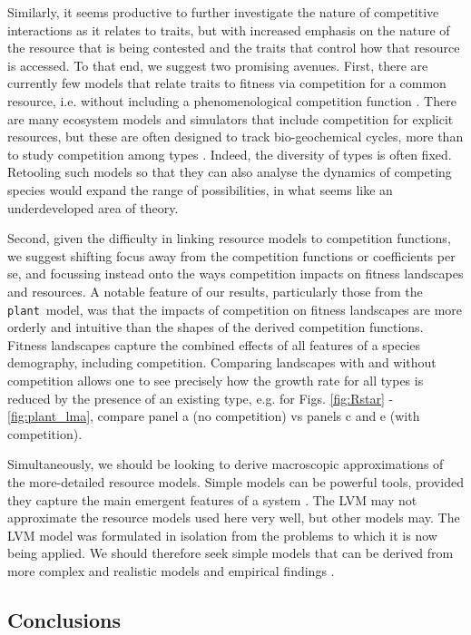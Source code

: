 \documentclass[a4paper,11pt]{article}
\newcommand{\plant}{{\tt plant}}
\begin{document}
Similarly, it seems productive to further investigate the nature of competitive interactions as it relates to traits, but with increased emphasis on the nature of the resource that is being contested and the traits that control how that resource is accessed. To that end, we suggest two promising avenues. First, there are currently few models that relate traits to fitness via competition for a common resource, i.e. without including a phenomenological competition function \citep{DAndrea-2016a}. There are many ecosystem models and simulators that include competition for explicit resources, but these are often designed to track bio-geochemical cycles, more than to study competition among types \citep{Fisher-2018}. Indeed, the diversity of types is often fixed. Retooling such models so that they can also analyse the dynamics of competing species would expand the range of possibilities, in what seems like an underdeveloped area of theory.

Second, given the difficulty in linking resource models to competition functions, we suggest shifting focus away from the competition functions or coefficients per se, and focussing instead onto the ways competition impacts on fitness landscapes and resources. A notable feature of our results, particularly those from the \plant\ model, was that the impacts of competition on fitness landscapes are more orderly and intuitive than the shapes of the derived competition functions. Fitness landscapes capture the combined effects of all features of a species demography, including competition. Comparing landscapes with and without competition allows one to see precisely how the growth rate for all types is reduced by the presence of an existing type, e.g. for Figs. \ref{fig:Rstar} - \ref{fig:plant_lma}, compare panel a (no competition) vs panels c and e (with competition). 

Simultaneously, we should be looking to derive macroscopic approximations of the more-detailed resource models. Simple models can be powerful tools, provided they capture the main emergent features of a system \citep{Levin-2006}. The LVM may not approximate the resource models used here very well, but other models may. The LVM model was formulated in isolation from the problems to which it is now being applied. We should therefore seek simple models that can be derived from more complex and realistic models and empirical findings \citep[e.g.][]{Champagnat-2006}.

\subsection{Conclusions}
\end{document}
